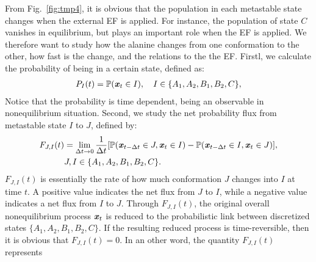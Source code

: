 \documentclass[a4paper,preprint,unsortedaddress,onecolumn]{revtex4-1}
\newcommand{\vect}[1]{\textbf{\textit{#1}}}
\newcommand{\fwd}[0]{\textrm{fwd}}
\newcommand{\bwd}[0]{\textrm{bwd}}
\begin{document}
From Fig.~\ref{fig:tmp4}, it is obvious that the population in each
metastable state changes when the external EF is applied.
For instance, the population of state $C$ vanishes in equilibrium,
but plays an important role when the EF is applied. We
therefore want to study how the alanine changes from one conformation
to the other, how fast is the change, and the relations to the 
the EF. 
Firstl, we calculate the probability of being in a certain state,
defined as:
\begin{align}
  P_I(t) = \mathbb P (\vect x_t \in I), \quad  I \in \{A_1, A_2, B_1, B_2, C\},
\end{align}
Notice that the probability is time dependent, being an observable in nonequilibrium situation.
Second,
we study the net probability flux from metastable state $I$ to $J$, defined by:
\begin{align}\nonumber
  F_{J,I}(t) & =\lim_{\Delta t\rightarrow 0} \frac1{\Delta t} [\mathbb P( \vect x_{t-\Delta t} \in J, \vect x_t \in I) - \mathbb P( \vect x_{t-\Delta t} \in I, \vect x_t \in J)], \\\label{eqn:tmp7}
  & J,I \in \{A_1, A_2, B_1, B_2, C\}.
\end{align}
$F_{J,I}(t)$ is essentially the rate of how much conformation $J$ changes
into $I$ at time $t$. A positive value indicates the
net flux from $J$ to $I$,
while a negative value indicates a net flux from $I$ to $J$.
Through $F_{J,I}(t)$, the original overall nonequilibrium process $\vect x_t$
is reduced to the probabilistic link between discretized states $\{A_1, A_2, B_1, B_2, C\}$.
If the resulting reduced process 
is time-reversible, then it is obvious that
$ F_{J,I}(t) = 0$. In an other word, the quantity $ F_{J,I}(t) $ represents
\end{document}
